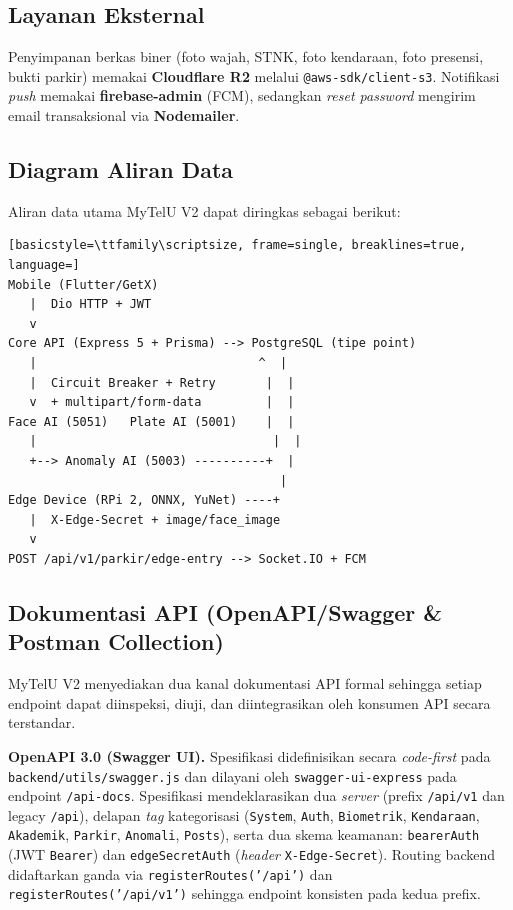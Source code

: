 \documentclass[12pt,titlepage,a4paper]{report}
\begin{document}
\subsection{Layanan Eksternal}
Penyimpanan berkas biner (foto wajah, STNK, foto kendaraan, foto presensi, bukti parkir) memakai \textbf{Cloudflare R2} melalui \texttt{@aws-sdk/client-s3}. Notifikasi \textit{push} memakai \textbf{firebase-admin} (FCM), sedangkan \textit{reset password} mengirim email transaksional via \textbf{Nodemailer}.

\subsection{Diagram Aliran Data}
Aliran data utama MyTelU V2 dapat diringkas sebagai berikut:
\begin{lstlisting}[basicstyle=\ttfamily\scriptsize, frame=single, breaklines=true, language=]
Mobile (Flutter/GetX)
   |  Dio HTTP + JWT
   v
Core API (Express 5 + Prisma) --> PostgreSQL (tipe point)
   |                               ^  |
   |  Circuit Breaker + Retry       |  |
   v  + multipart/form-data         |  |
Face AI (5051)   Plate AI (5001)    |  |
   |                                 |  |
   +--> Anomaly AI (5003) ----------+  |
                                      |
Edge Device (RPi 2, ONNX, YuNet) ----+
   |  X-Edge-Secret + image/face_image
   v
POST /api/v1/parkir/edge-entry --> Socket.IO + FCM
\end{lstlisting}

\subsection{Dokumentasi API (OpenAPI/Swagger \& Postman Collection)}
MyTelU V2 menyediakan dua kanal dokumentasi API formal sehingga setiap endpoint dapat diinspeksi, diuji, dan diintegrasikan oleh konsumen API secara terstandar.

\textbf{OpenAPI 3.0 (Swagger UI).} Spesifikasi didefinisikan secara \textit{code-first} pada \texttt{backend/utils/swagger.js} dan dilayani oleh \texttt{swagger-ui-express} pada endpoint \texttt{/api-docs}. Spesifikasi mendeklarasikan dua \textit{server} (prefix \texttt{/api/v1} dan legacy \texttt{/api}), delapan \textit{tag} kategorisasi (\texttt{System}, \texttt{Auth}, \texttt{Biometrik}, \texttt{Kendaraan}, \texttt{Akademik}, \texttt{Parkir}, \texttt{Anomali}, \texttt{Posts}), serta dua skema keamanan: \texttt{bearerAuth} (JWT \texttt{Bearer}) dan \texttt{edgeSecretAuth} (\textit{header} \texttt{X-Edge-Secret}). Routing backend didaftarkan ganda via \texttt{registerRoutes('/api')} dan \texttt{registerRoutes('/api/v1')} sehingga endpoint konsisten pada kedua prefix.
\end{document}
